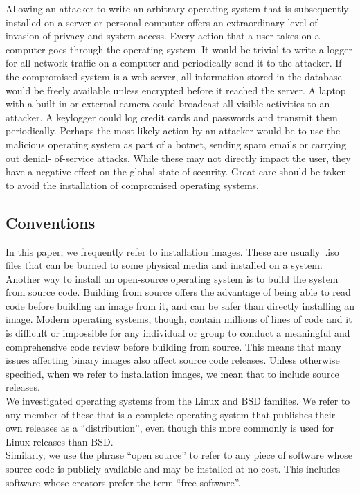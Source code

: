 \documentclass[conference]{IEEEtran}
\begin{document}
Allowing an attacker to write an arbitrary operating system that is subsequently
installed on a server or personal computer offers an extraordinary level of
invasion of privacy and system access. Every action that a user takes on a
computer goes through the operating system. It would be trivial to write a logger
for all network traffic on a computer and periodically send it to the attacker. If
the compromised system is a web server, all information stored in the database would
be freely available unless encrypted before it reached the server. A laptop with a
built-in or external camera could broadcast all visible activities to an attacker.
A keylogger could log credit cards and passwords and transmit them periodically.
Perhaps the most likely action by an attacker would be to use the malicious
operating system as part of a botnet, sending spam emails or carrying out denial-
of-service attacks. While these may not directly impact the user, they have a
negative effect on the global state of security. Great care should be taken to avoid
the installation of compromised operating systems.

\subsection{Conventions}

In this paper, we frequently refer to installation images. These are usually~.iso
files that can be burned to some physical media and installed on a system. Another
way to install an open-source operating system is to build the system from source
code. Building from source offers the advantage of being able to read code before
building an image from it, and can be safer than directly installing an image.
Modern operating systems, though, contain millions of lines of code and it is
difficult or impossible for any individual or group to conduct a meaningful and
comprehensive code review before building from source. This means that many issues
affecting binary images also affect source code releases. Unless otherwise specified,
when we refer to installation images, we mean that to include source releases.\\
\indent We investigated operating systems from the Linux and BSD families. We refer to any
member of these that is a complete operating system that publishes their own releases
as a ``distribution'', even though this more commonly is used for Linux releases
than BSD.\\
\indent Similarly, we use the phrase ``open source'' to refer to any piece of
software whose source code is publicly available and may be installed at no cost.
This includes software whose creators prefer the term ``free software''.
\end{document}
